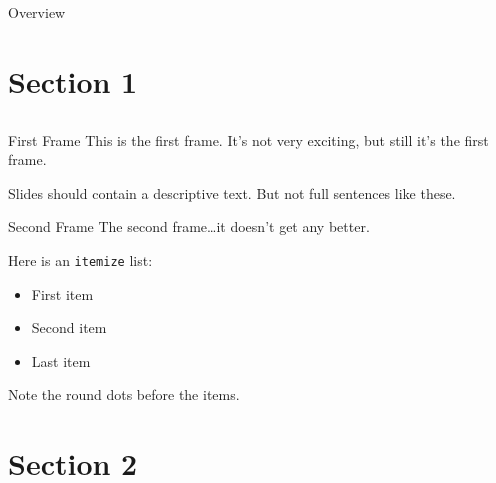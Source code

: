 


\section*{}

\begin{frame}{Overview}
    \tableofcontents
\end{frame}





\section{Section 1}
\subsection*{}

\begin{frame}{First Frame}
    This is the first frame.
    It's not very exciting, but still it's the first frame.

    Slides should contain a descriptive text.
    But not full sentences like these.
\end{frame}

\begin{frame}{Second Frame}
    The second frame\dots it doesn't get any better.

    Here is an \texttt{itemize} list:
    \begin{itemize}
        \item
        First item

        \item
        Second item

        \item
        Last item
    \end{itemize}
    Note the round dots before the items.
\end{frame}




\section{Section 2}
\subsection*{}

